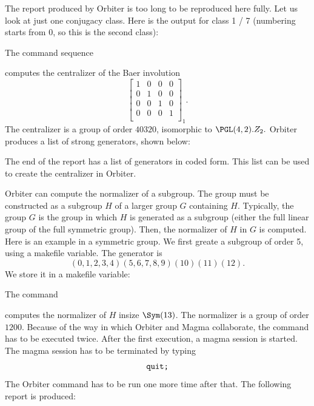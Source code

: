 \bigskip


The report produced by Orbiter is too long to be reproduced here fully. 
Let us look at just one conjugacy class. 
Here is the output for class 1 / 7 (numbering starts from 0, so this is the second class):

\bigskip


\begin{mdframed}[style=MyFrame]

\end{mdframed}




\bigskip

The command sequence 
{\tt

}
computes the centralizer of the Baer involution
$$
\left[
\begin{array}{cccc}
	1&0&0&0\\
	0&1&0&0\\
	0&0&1&0\\
	0&0&0&1\\
\end{array}
\right]_1.
$$
The centralizer is a group of order $40320$, isomorphic to $\PGL(4,2).Z_2.$ 
Orbiter produces a list of strong generators, shown below: 
\begin{mdframed}[style=MyFrame]

\end{mdframed}
The end of the report has a list of generators in coded form. This list can be used to 
create the centralizer in Orbiter. 

\bigskip


Orbiter can compute the normalizer of a subgroup. 
The group must be constructed as a subgroup $H$ of a larger group $G$ containing $H$.
Typically, the group $G$ is the group in which $H$ is generated as a subgroup 
(either the full linear group of the full symmetric group).
Then, the normalizer of $H$ in $G$ is computed. 
Here is an example in a symmetric group. 
We first greate a subgroup of order 5, using a makefile variable. The generator is 
$$
(0,1,2,3,4)(5,6,7,8,9)(10)(11)(12).
$$
We store it in a makefile variable:
{\tt

}
The command
{\tt

}
computes the normalizer of $H$ insize $\Sym(13)$. The normalizer is a group of order $1200$. 
Because of the way in which Orbiter and Magma collaborate, the command has to be executed twice. 
After the first execution, a magma session is started.  
The magma session has to be terminated by typing 
$$
\verb'quit;'
$$
The Orbiter command has to be run one more time after that.
The following report is produced:
\begin{mdframed}[style=MyFrame]

\end{mdframed}


